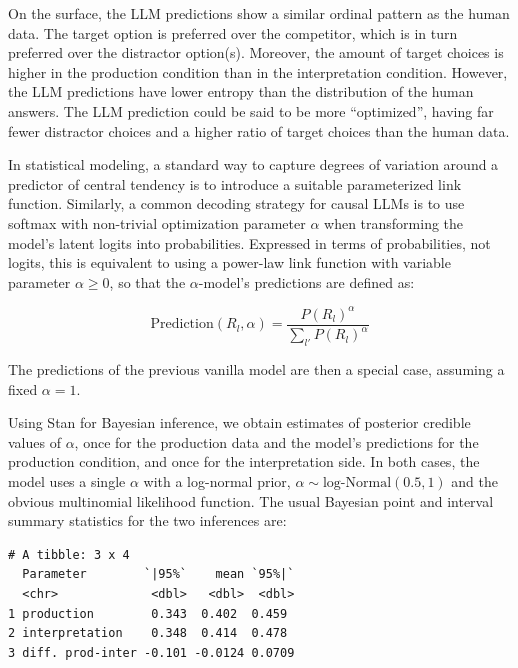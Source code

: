 \documentclass{article}
\begin{document}


On the surface, the LLM predictions show a similar ordinal pattern as the human data.
The target option is preferred over the competitor, which is in turn preferred over the distractor option(s).
Moreover, the amount of target choices is higher in the production condition than in the interpretation condition.
However, the LLM predictions have lower entropy than the distribution of the human answers.
The LLM prediction could be said to be more ``optimized'', having far fewer distractor choices and a higher ratio of target choices than the human data.

In statistical modeling, a standard way to capture degrees of variation around a predictor of central tendency is to introduce a suitable parameterized link function.
Similarly, a common decoding strategy for causal LLMs is to use softmax with non-trivial optimization parameter $\alpha$ when transforming the model's latent logits into probabilities.
Expressed in terms of probabilities, not logits, this is equivalent to using a power-law link function \citep{WorthyMaddox2008:Ratio-and-Diffe} with variable parameter \(\alpha \ge 0\), so that the $\alpha$-model's predictions are defined as:

\[\text{Prediction}(R_{l}, \alpha) = \frac{P(R_{l})^\alpha}{\sum_{l'} P(R_{l})^\alpha}\]

The predictions of the previous vanilla model are then a special case, assuming a fixed \(\alpha =1\).

Using Stan \citep{Team2023:The-Stan-Core-L} for Bayesian inference, we obtain estimates of posterior credible values of \(\alpha\), once for the production data and the model's predictions for the production condition, and once for the interpretation side.
In both cases, the model uses a single \(\alpha\) with a log-normal prior, \(\alpha \sim \text{log-Normal}(0.5,1)\) and the obvious multinomial likelihood function.
The usual Bayesian point and interval summary statistics for the two inferences are: 

\begin{verbatim}
# A tibble: 3 x 4
  Parameter        `|95%`    mean `95%|`
  <chr>             <dbl>   <dbl>  <dbl>
1 production        0.343  0.402  0.459
2 interpretation    0.348  0.414  0.478
3 diff. prod-inter -0.101 -0.0124 0.0709
\end{verbatim}
\end{document}
